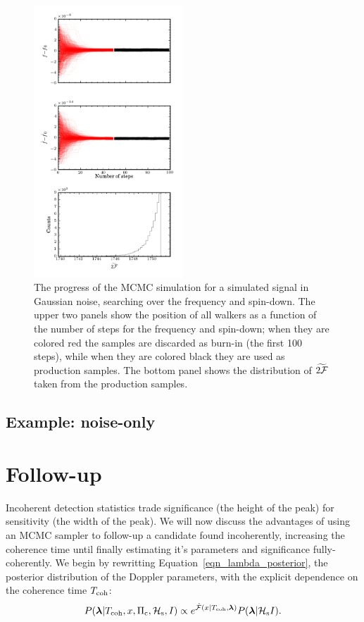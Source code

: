 \documentclass[aps, prd, twocolumn, superscriptaddress, floatfix, showpacs, nofootinbib, longbibliography]{revtex4-1}
\begin{document}
\begin{figure}[htb]
\centering
\includegraphics[width=0.5\textwidth]{fully_coherent_search_using_MCMC_walkers}
\caption{The progress of the MCMC simulation for a simulated signal in Gaussian
noise, searching over the frequency and spin-down. The upper two panels show
the position of all walkers as a function of the number of steps for the
frequency and spin-down; when they are colored red the samples are discarded as
burn-in (the first 100 steps), while when they are colored black they are used
as production samples. The bottom panel shows the distribution of
$\widetilde{2{\mathcal{F}}}$ taken from the production samples.}
\label{fig_MCMC_simple_example}
\end{figure}

\subsection{Example: noise-only}

\section{Follow-up}
\label{sec_follow_up}

Incoherent detection statistics trade significance (the height of the peak) for
sensitivity (the width of the peak). We will now discuss the advantages of
using an MCMC sampler to follow-up a candidate found incoherently, increasing
the coherence time until finally estimating it's parameters and significance
fully-coherently. We begin by rewritting Equation~\eqref{eqn_lambda_posterior},
the posterior distribution of the Doppler parameters, with the explicit
dependence on the coherence time $T_{\rm coh}$:
\begin{equation}
P(\boldsymbol{\mathbf{\lambda}} | T_{\rm coh}, x, \Pi_{\rm c}, \mathcal{H}_{\rm s}, I)
\propto e^{\hat{{\mathcal{F}}}(x| T_{\rm coh}, \boldsymbol{\mathbf{\lambda}})} P(\boldsymbol{\mathbf{\lambda}}| \mathcal{H}_{\rm s} I).
\end{equation}
\end{document}
